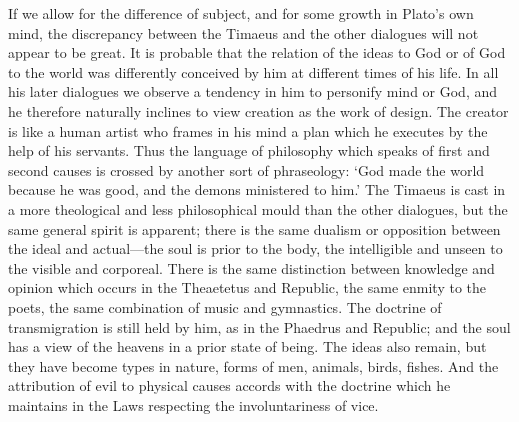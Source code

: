 If we allow for the difference of subject, and for some growth in Plato’s
own mind, the discrepancy between the Timaeus and the other dialogues will
not appear to be great. It is probable that the relation of the ideas to
God or of God to the world was differently conceived by him at different
times of his life. In all his later dialogues we observe a tendency in him
to personify mind or God, and he therefore naturally inclines to view
creation as the work of design. The creator is like a human artist who
frames in his mind a plan which he executes by the help of his servants.
Thus the language of philosophy which speaks of first and second causes is
crossed by another sort of phraseology: ‘God made the world because he was
good, and the demons ministered to him.’ The Timaeus is cast in a more
theological and less philosophical mould than the other dialogues, but the
same general spirit is apparent; there is the same dualism or opposition
between the ideal and actual—the soul is prior to the body, the
intelligible and unseen to the visible and corporeal. There is the same
distinction between knowledge and opinion which occurs in the Theaetetus
and Republic, the same enmity to the poets, the same combination of music
and gymnastics. The doctrine of transmigration is still held by him, as in
the Phaedrus and Republic; and the soul has a view of the heavens in a
prior state of being. The ideas also remain, but they have become types in
nature, forms of men, animals, birds, fishes. And the attribution of evil
to physical causes accords with the doctrine which he maintains in the
Laws respecting the involuntariness of vice.

